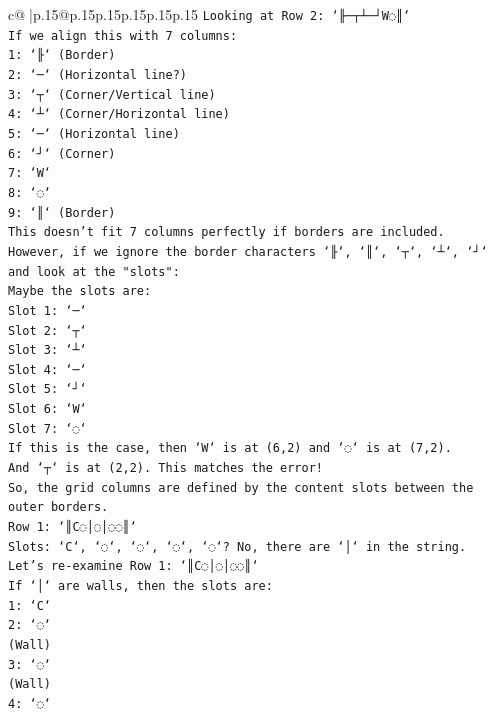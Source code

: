 \documentclass{article}
\begin{document}
{\begin{supertabular}{c@{$\;$}|p{.15\linewidth}@{}p{.15\linewidth}p{.15\linewidth}p{.15\linewidth}p{.15\linewidth}p{.15\linewidth}}
{{{\texttt{Looking at Row 2: `╟─┬┴─┘W◌║`} \\
\texttt{If we align this with 7 columns:} \\
\texttt{1: `╟` (Border)} \\
\texttt{2: `─` (Horizontal line?)} \\
\texttt{3: `┬` (Corner/Vertical line)} \\
\texttt{4: `┴` (Corner/Horizontal line)} \\
\texttt{5: `─` (Horizontal line)} \\
\texttt{6: `┘` (Corner)} \\
\texttt{7: `W`} \\
\texttt{8: `◌`} \\
\texttt{9: `║` (Border)} \\
\texttt{This doesn't fit 7 columns perfectly if borders are included.} \\
\texttt{However, if we ignore the border characters `╟`, `║`, `┬`, `┴`, `┘` and look at the "slots":} \\
\texttt{Maybe the slots are:} \\
\texttt{Slot 1: `─`} \\
\texttt{Slot 2: `┬`} \\
\texttt{Slot 3: `┴`} \\
\texttt{Slot 4: `─`} \\
\texttt{Slot 5: `┘`} \\
\texttt{Slot 6: `W`} \\
\texttt{Slot 7: `◌`} \\
\texttt{If this is the case, then `W` is at (6,2) and `◌` is at (7,2).} \\
\texttt{And `┬` is at (2,2). This matches the error!} \\
\texttt{So, the grid columns are defined by the content slots between the outer borders.} \\
\texttt{Row 1: `║C◌│◌│◌◌║`} \\
\texttt{Slots: `C`, `◌`, `◌`, `◌`, `◌`? No, there are `│` in the string.} \\
\texttt{Let's re{-}examine Row 1: `║C◌│◌│◌◌║`} \\
\texttt{If `│` are walls, then the slots are:} \\
\texttt{1: `C`} \\
\texttt{2: `◌`} \\
\texttt{(Wall)} \\
\texttt{3: `◌`} \\
\texttt{(Wall)} \\
\texttt{4: `◌`} \\
}}}
\end{supertabular}}
\end{document}
